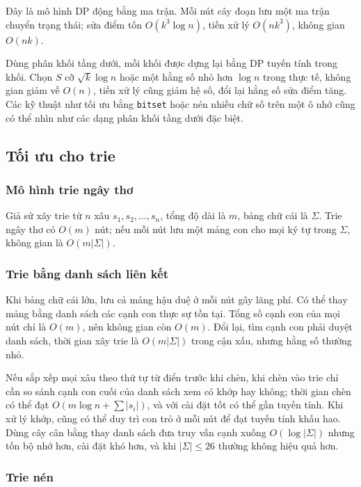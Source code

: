 \documentclass[11pt]{article}
\begin{document}
Đây là mô hình DP động bằng ma trận. Mỗi nút cây đoạn lưu một ma trận chuyển
trạng thái; sửa điểm tốn $O(k^3\log n)$, tiền xử lý $O(nk^3)$, không gian
$O(nk)$.

Dùng phân khối tầng dưới, mỗi khối được dựng lại bằng DP tuyến tính trong
khối. Chọn $S$ cỡ $\sqrt{k}\log n$ hoặc một hằng số nhỏ hơn $\log n$ trong thực
tế, không gian giảm về $O(n)$, tiền xử lý cũng giảm hệ số, đổi lại hằng số sửa
điểm tăng. Các kỹ thuật như tối ưu bằng \texttt{bitset} hoặc nén nhiều chữ số
trên một ô nhớ cũng có thể nhìn như các dạng phân khối tầng dưới đặc biệt.

\subsection{Tối ưu cho trie}

\subsubsection{Mô hình trie ngây thơ}

Giả sử xây trie từ $n$ xâu $s_1,s_2,\ldots,s_n$, tổng độ dài là $m$, bảng chữ
cái là $\Sigma$. Trie ngây thơ có $O(m)$ nút; nếu mỗi nút lưu một mảng con cho
mọi ký tự trong $\Sigma$, không gian là $O(m|\Sigma|)$.

\subsubsection{Trie bằng danh sách liên kết}

Khi bảng chữ cái lớn, lưu cả mảng hậu duệ ở mỗi nút gây lãng phí. Có thể thay
mảng bằng danh sách các cạnh con thực sự tồn tại. Tổng số cạnh con của mọi nút
chỉ là $O(m)$, nên không gian còn $O(m)$. Đổi lại, tìm cạnh con phải duyệt danh
sách, thời gian xây trie là $O(m|\Sigma|)$ trong cận xấu, nhưng hằng số thường
nhỏ.

Nếu sắp xếp mọi xâu theo thứ tự từ điển trước khi chèn, khi chèn vào trie chỉ
cần so sánh cạnh con cuối của danh sách xem có khớp hay không; thời gian chèn
có thể đạt $O(m\log n+\sum |s_i|)$, và với cài đặt tốt có thể gần tuyến tính.
Khi xử lý khớp, cũng có thể duy trì con trỏ ở mỗi nút để đạt tuyến tính khấu
hao. Dùng cây cân bằng thay danh sách đưa truy vấn cạnh xuống $O(\log|\Sigma|)$
nhưng tốn bộ nhớ hơn, cài đặt khó hơn, và khi $|\Sigma|\le 26$ thường không
hiệu quả hơn.

\subsubsection{Trie nén}
\end{document}
